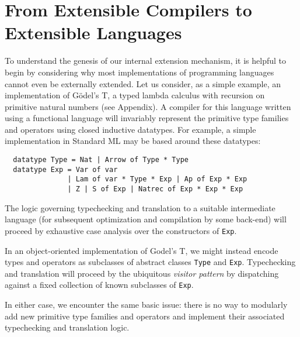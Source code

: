 
\section{From Extensible Compilers to Extensible Languages}\label{evolution}
To understand the genesis of our internal extension mechanism, it is helpful to begin by considering why most implementations of programming languages cannot even be  externally extended. 
Let us consider, as a simple example, an implementation of G\"odel's T, a typed lambda calculus with recursion on primitive natural numbers (see Appendix). 
A compiler for this language written using a functional language will invariably represent the primitive type families and operators using {closed} inductive datatypes. 
For example, a simple implementation in Standard ML may be based around these datatypes:
\begin{lstlisting}
  datatype Type = Nat | Arrow of Type * Type
  datatype Exp = Var of var 
               | Lam of var * Type * Exp | Ap of Exp * Exp 
               | Z | S of Exp | Natrec of Exp * Exp * Exp
\end{lstlisting}

The logic governing typechecking and translation to a suitable intermediate language (for subsequent optimization and compilation by some back-end) will proceed by exhaustive case analysis over the constructors of \lstinline{Exp}.

In an object-oriented implementation of Godel's T, we might instead encode types and operators as subclasses of abstract classes \lstinline{Type} and \lstinline{Exp}. Typechecking and translation will proceed by the ubiquitous \emph{visitor pattern}  by dispatching against a fixed collection of {known} subclasses of \lstinline{Exp}. 

In either case, we encounter the same basic issue: there is no way to modularly add new primitive type families and operators and implement their associated typechecking and translation logic. 


